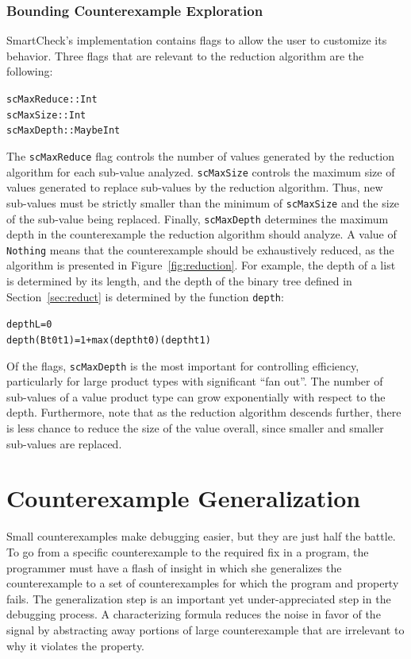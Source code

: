 \documentclass{sigplanconf}
\newenvironment{code}{\begin{alltt}}{\end{alltt}}
\newcommand{\ttp}[1]{\texttt{#1}}
\begin{document}
\subsubsection{Bounding Counterexample Exploration}

SmartCheck's implementation contains flags to allow the user to customize its
behavior.  Three flags that are relevant to the reduction algorithm are the
following:
%
\begin{code}
scMaxReduce :: Int
scMaxSize   :: Int
scMaxDepth  :: Maybe Int
\end{code}
%
\noindent
The \ttp{scMaxReduce} flag controls the number of values generated by the
reduction algorithm for each sub-value analyzed.  \ttp{scMaxSize} controls the
maximum size of values generated to replace sub-values by the reduction
algorithm.  Thus, new sub-values must be strictly smaller than the minimum of
\ttp{scMaxSize} and the size of the sub-value being replaced.  Finally,
\ttp{scMaxDepth} determines the maximum depth in the counterexample the
reduction algorithm should analyze.  A value of \ttp{Nothing} means that the
counterexample should be exhaustively reduced, as the algorithm is presented in
Figure~\ref{fig:reduction}.  For example, the depth of a list is determined by
its length, and the depth of the binary tree defined in Section~\ref{sec:reduct}
is determined by the function \ttp{depth}:
%
\begin{code}
depth L         = 0
depth (B t0 t1) = 1 + max (depth t0) (depth t1)
\end{code}
%
\noindent
Of the flags, \ttp{scMaxDepth} is the most important for controlling
efficiency, particularly for large product types with significant ``fan out''.
The number of sub-values of a value product type can grow exponentially with
respect to the depth.  Furthermore, note that as the reduction algorithm
descends further, there is less chance to reduce the size of the value overall,
since smaller and smaller sub-values are replaced.

\section{Counterexample Generalization}\label{sec:generalization}

Small counterexamples make debugging easier, but they are just half the battle.
To go from a specific counterexample to the required fix in a program, the
programmer must have a flash of insight in which she generalizes the
counterexample to a set of counterexamples for which the program and property
fails.  The generalization step is an important yet under-appreciated step in
the debugging process.  A characterizing formula reduces the noise in favor of
the signal by abstracting away portions of large counterexample that are
irrelevant to why it violates the property.
\end{document}
